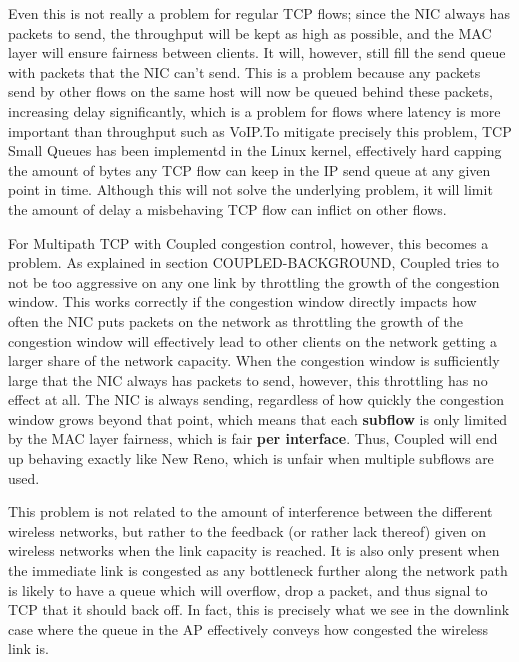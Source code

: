 Even this is not really a problem for regular TCP flows; since the NIC always
has packets to send, the throughput will be kept as high as possible, and the
MAC layer will ensure fairness between clients. It will, however, still fill the
send queue with packets that the NIC can't send. This is a problem because any
packets send by other flows on the same host will now be queued behind these
packets, increasing delay significantly, which is a problem for flows where
latency is more important than throughput such as VoIP.\@  To mitigate precisely
this problem, TCP Small Queues has been implementd in the Linux kernel,
effectively hard capping the amount of bytes any TCP flow can keep in the IP
send queue at any given point in time. Although this will not solve the
underlying problem, it will limit the amount of delay a misbehaving TCP flow can
inflict on other flows.

For Multipath TCP with Coupled congestion control, however, this becomes a
problem. As explained in section COUPLED-BACKGROUND, Coupled tries to not be   %
too aggressive on any one link by throttling the
growth of the congestion window.
This works correctly if the congestion window
directly impacts how often the NIC puts packets on the network as throttling the
growth of the congestion window will effectively lead to other clients on the
network getting a larger share of the network capacity. When the congestion
window is sufficiently large that the NIC always has packets to send, however,
this throttling has no effect at all. The NIC is always sending, regardless of
how quickly the congestion window grows beyond that point, which means that each
\textbf{subflow} is only limited by the MAC layer fairness, which is fair
\textbf{per interface}. Thus, Coupled will end up behaving exactly like New
Reno, which is unfair when multiple subflows are used.

This problem is not related to the amount of interference between the different
wireless networks, but rather to the feedback (or rather lack thereof) given on
wireless networks when the link capacity is reached. It is also only present
when the immediate link is congested as any bottleneck further along the network
path is likely to have a queue which will overflow, drop a packet, and thus
signal to TCP that it should back off. In fact, this is precisely what we see in
the downlink case where the queue in the AP effectively conveys how congested
the wireless link is.

